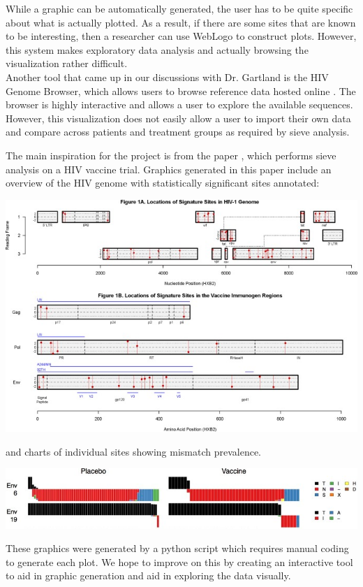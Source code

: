 \documentclass{article}
\begin{document}
While a graphic can be automatically generated, the user has to be quite specific about what is actually plotted.  As a result, if there are some sites that are known to be interesting, then a researcher can use WebLogo to construct plots.  However, this system makes exploratory data analysis and actually browsing the visualization rather difficult.
\\
\newline
\noindent Another tool that came up in our discussions with Dr. Gartland is the HIV Genome Browser, which allows users to browse reference data hosted online \cite{hivgenomebrowser}.   The browser is highly interactive and allows a user to explore the available sequences.   However, this visualization does not easily allow a user to import their own data and compare across patients and treatment groups as required by sieve analysis.  

The main inspiration for the project is from the paper \cite{comprehensive}, which performs sieve analysis on a HIV vaccine trial. Graphics generated in this paper include an overview of the HIV genome with statistically significant sites annotated:
\begin{center}
	\includegraphics[width=7in]{fig2}
\end{center}
and charts of individual sites showing mismatch prevalence.
\begin{center}
	\includegraphics[width=7in]{fig3}
\end{center}
These graphics were generated by a python script which requires manual coding to generate each plot. We hope to improve on this by creating an interactive tool to aid in graphic generation and aid in exploring the data visually.
\end{document}
